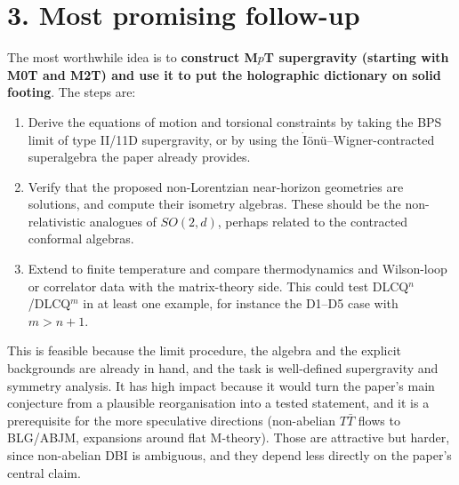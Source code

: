 \documentclass[11pt]{article}
\begin{document}
\section*{3. Most promising follow-up}
The most worthwhile idea is to \textbf{construct M$p$T supergravity (starting with M0T and M2T) and use it to put the holographic dictionary on solid footing}. The steps are:
\begin{enumerate}
\item Derive the equations of motion and torsional constraints by taking the BPS limit of type II/11D supergravity, or by using the $\dot{\text{I}}$\"on\"u--Wigner-contracted superalgebra the paper already provides.
\item Verify that the proposed non-Lorentzian near-horizon geometries are solutions, and compute their isometry algebras. These should be the non-relativistic analogues of $SO(2,d)$, perhaps related to the contracted conformal algebras.
\item Extend to finite temperature and compare thermodynamics and Wilson-loop or correlator data with the matrix-theory side. This could test DLCQ$^n$/DLCQ$^m$ in at least one example, for instance the D1--D5 case with $m>n+1$.
\end{enumerate}
This is feasible because the limit procedure, the algebra and the explicit backgrounds are already in hand, and the task is well-defined supergravity and symmetry analysis. It has high impact because it would turn the paper's main conjecture from a plausible reorganisation into a tested statement, and it is a prerequisite for the more speculative directions (non-abelian $T\bar T$ flows to BLG/ABJM, expansions around flat M-theory). Those are attractive but harder, since non-abelian DBI is ambiguous, and they depend less directly on the paper's central claim.
\end{document}
